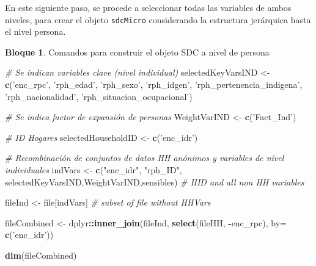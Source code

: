 \documentclass[]{book}
\newenvironment{Shaded}{\begin{snugshade}}{\end{snugshade}}
\newcommand{\CommentTok}[1]{\textcolor[rgb]{0.56,0.35,0.01}{\textit{#1}}}
\newcommand{\DataTypeTok}[1]{\textcolor[rgb]{0.13,0.29,0.53}{#1}}
\newcommand{\KeywordTok}[1]{\textcolor[rgb]{0.13,0.29,0.53}{\textbf{#1}}}
\newcommand{\NormalTok}[1]{#1}
\newcommand{\OperatorTok}[1]{\textcolor[rgb]{0.81,0.36,0.00}{\textbf{#1}}}
\newcommand{\StringTok}[1]{\textcolor[rgb]{0.31,0.60,0.02}{#1}}
\theoremstyle{definition}
\theoremstyle{definition}
\newtheorem{example}{Bloque}[chapter]
\theoremstyle{definition}
\theoremstyle{definition}
\theoremstyle{remark}
\begin{document}
En este siguiente paso, se procede a seleccionar todas las variables de ambos niveles, para crear el objeto \texttt{sdcMicro} considerando la estructura jerárquica hasta el nivel persona.

\begin{example}
\protect\hypertarget{exm:bloque48nbm}{}{\label{exm:bloque48nbm} }Comandos para construir el objeto SDC a nivel de persona
\end{example}

\begin{Shaded}
\begin{Highlighting}[]
\CommentTok{# Se indican variables clave (nivel individual)}
\NormalTok{selectedKeyVarsIND <-}\StringTok{ }\KeywordTok{c}\NormalTok{(}\StringTok{'enc_rpc'}\NormalTok{,}
                        \StringTok{'rph_edad'}\NormalTok{,}
                        \StringTok{'rph_sexo'}\NormalTok{,}
                        \StringTok{'rph_idgen'}\NormalTok{,}
                        \StringTok{'rph_pertenencia_indigena'}\NormalTok{, }
                       \StringTok{'rph_nacionalidad'}\NormalTok{,}
                       \StringTok{'rph_situacion_ocupacional'}\NormalTok{) }

\CommentTok{# Se indica factor de expansión de personas}
\NormalTok{WeightVarIND <-}\StringTok{ }\KeywordTok{c}\NormalTok{(}\StringTok{'Fact_Ind'}\NormalTok{)}

\CommentTok{# ID Hogares}
\NormalTok{selectedHouseholdID <-}\StringTok{ }\KeywordTok{c}\NormalTok{(}\StringTok{'enc_idr'}\NormalTok{)}

\CommentTok{# Recombinación de conjuntos de datos HH anónimos y variables de nivel individuales}
\NormalTok{indVars <-}\StringTok{ }\KeywordTok{c}\NormalTok{(}\StringTok{"enc_idr"}\NormalTok{, }\StringTok{"rph_ID"}\NormalTok{, selectedKeyVarsIND,WeightVarIND,sensibles) }\CommentTok{# HID and all non HH variables}

\NormalTok{fileInd <-}\StringTok{ }\NormalTok{file[indVars] }\CommentTok{# subset of file without HHVars}

\NormalTok{fileCombined <-}\StringTok{ }\NormalTok{dplyr}\OperatorTok{::}\KeywordTok{inner_join}\NormalTok{(fileInd, }\KeywordTok{select}\NormalTok{(fileHH, }\OperatorTok{-}\NormalTok{enc_rpc), }\DataTypeTok{by=} \KeywordTok{c}\NormalTok{(}\StringTok{'enc_idr'}\NormalTok{))}

\KeywordTok{dim}\NormalTok{(fileCombined)}
\end{Highlighting}
\end{Shaded}
\end{document}
